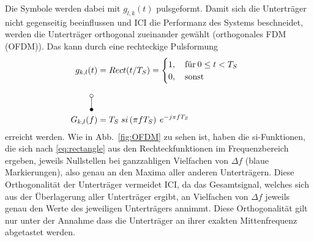 Die Symbole werden dabei mit $g_{l,k}(t)$ pulsgeformt. Damit sich die Unterträger nicht gegenseitig beeinflussen und \ac{ICI} die Performanz des Systems beschneidet, werden die Unterträger orthogonal zueinander gewählt (orthogonales \ac{FDM} (OFDM)). Das kann durch eine rechteckige Pulsformung 
\begin{equation}
\label{eq:rectangle}
\begin{aligned}
g_{k,l}(t) &= Rect(t/T_S) = 
    \begin{cases}
    1, \quad \text{für} \: 0 \leq t < T_S \\
    0, \quad \text{sonst}
    \end{cases}\\
\rotatebox{270}{\laplace} \\
G_{k,l}(f) &= T_S \; si\left(\pi f T_S\right)\: e^{-j \pi f T_S}
\end{aligned}
\end{equation}
erreicht werden. Wie in Abb.~\ref{fig:OFDM} zu sehen ist, haben die si-Funktionen, die sich nach \ref{eq:rectangle} aus den Rechteckfunktionen im Frequenzbereich ergeben, jeweils Nullstellen bei ganzzahligen Vielfachen von $\Delta f$ (blaue Markierungen), also genau an den Maxima aller anderen Unterträgern. Diese Orthogonalität der Unterträger vermeidet \ac{ICI}, da das Gesamtsignal, welches sich aus der Überlagerung aller Unterträger ergibt, an Vielfachen von $\Delta f$ jeweils genau den Werte des jeweiligen Unterträgers annimmt. Diese Orthogonalität gilt nur unter der Annahme dass die Unterträger an ihrer exakten Mittenfrequenz abgetastet werden.\\


